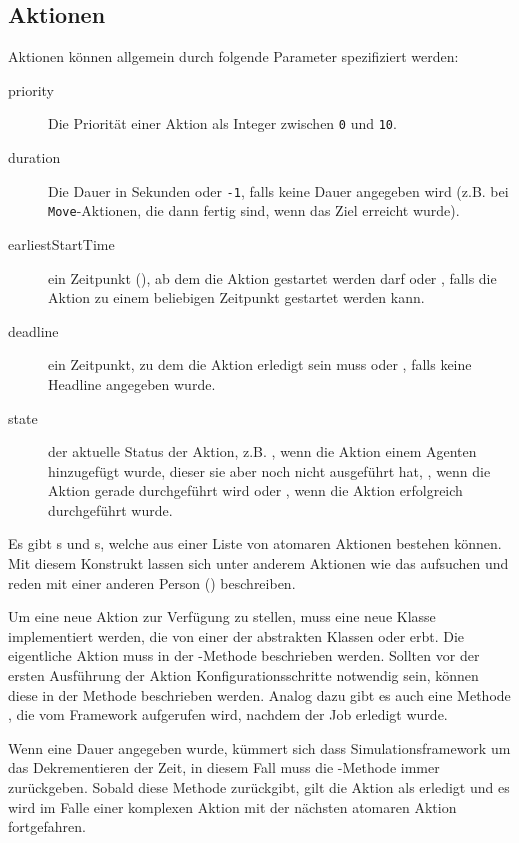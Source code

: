 \subsection{Aktionen}\label{subsec:concept_actions}
Aktionen können allgemein durch folgende Parameter spezifiziert werden:
\begin{description}
	\item[priority] Die Priorität einer Aktion als Integer zwischen \texttt{0} und \texttt{10}.
	\item[duration] Die Dauer in Sekunden oder \texttt{-1}, falls keine Dauer angegeben wird (z.B. bei \texttt{Move}-Aktionen, die dann fertig sind, wenn das Ziel erreicht wurde).
	\item[earliestStartTime] ein Zeitpunkt (), ab dem die Aktion gestartet werden darf oder , falls die Aktion zu einem beliebigen Zeitpunkt gestartet werden kann.
	\item[deadline] ein Zeitpunkt, zu dem die Aktion erledigt sein muss oder , falls keine Headline angegeben wurde.
	\item[state] der aktuelle Status der Aktion, z.B. , wenn die Aktion einem Agenten hinzugefügt wurde, dieser sie aber noch nicht ausgeführt hat, , wenn die Aktion gerade durchgeführt wird oder , wenn die Aktion erfolgreich durchgeführt wurde.
\end{description}
Es gibt s und s, welche aus einer Liste von atomaren Aktionen bestehen können. Mit diesem Konstrukt lassen sich unter anderem Aktionen wie das aufsuchen und reden mit einer anderen Person () beschreiben.

Um eine neue Aktion zur Verfügung zu stellen, muss eine neue Klasse implementiert werden, die von einer der abstrakten Klassen  oder  erbt. Die eigentliche Aktion muss in der -Methode beschrieben werden. Sollten vor der ersten Ausführung der Aktion Konfigurationsschritte notwendig sein, können diese in der Methode  beschrieben werden. Analog dazu gibt es auch eine Methode , die vom Framework aufgerufen wird, nachdem der Job erledigt wurde.

Wenn eine Dauer angegeben wurde, kümmert sich dass Simulationsframework um das Dekrementieren der Zeit, in diesem Fall muss die -Methode immer  zurückgeben. Sobald diese Methode  zurückgibt, gilt die Aktion als erledigt und es wird im Falle einer komplexen Aktion mit der nächsten atomaren Aktion fortgefahren.

